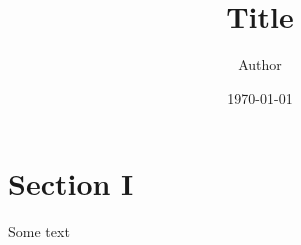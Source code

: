 \documentclass[a4paper,11pt,oneside]{article}
\title{Title}
\author{Author}
\date{\today}
\begin{document}
    \maketitle

    \section{Section I}
        Some text
\end{document}

